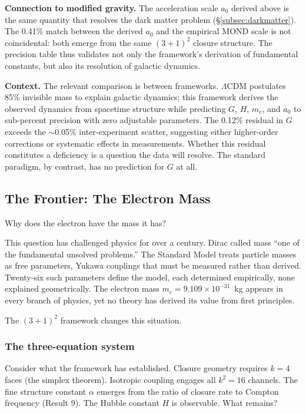 \documentclass[aps,prd,preprint,superscriptaddress,showpacs,preprintnumbers,amsmath,amssymb,nofootinbib]{revtex4-2}
\begin{document}
\textbf{Connection to modified gravity.} The acceleration scale $a_0$ derived above is the same quantity that resolves the dark matter problem (\S\ref{subsec:darkmatter}). The 0.41\% match between the derived $a_0$ and the empirical MOND scale is not coincidental: both emerge from the same $(3+1)^2$ closure structure. The precision table thus validates not only the framework's derivation of fundamental constants, but also its resolution of galactic dynamics.

\textbf{Context.} The relevant comparison is between frameworks. $\Lambda$CDM postulates 85\% invisible mass to explain galactic dynamics; this framework derives the observed dynamics from spacetime structure while predicting $G$, $H$, $m_e$, and $a_0$ to sub-percent precision with zero adjustable parameters. The 0.12\% residual in $G$ exceeds the $\sim$0.05\% inter-experiment scatter, suggesting either higher-order corrections or systematic effects in measurements. Whether this residual constitutes a deficiency is a question the data will resolve. The standard paradigm, by contrast, has no prediction for $G$ at all.

\subsection{The Frontier: The Electron Mass}
\label{subsec:frontier}

Why does the electron have the mass it has?

This question has challenged physics for over a century. Dirac called mass ``one of the fundamental unsolved problems.'' The Standard Model treats particle masses as free parameters, Yukawa couplings that must be measured rather than derived. Twenty-six such parameters define the model, each determined empirically, none explained geometrically. The electron mass $m_e = 9.109 \times 10^{-31}$~kg appears in every branch of physics, yet no theory has derived its value from first principles.

The $(3+1)^2$ framework changes this situation.

\subsubsection*{The three-equation system}

Consider what the framework has established. Closure geometry requires $k = 4$ faces (the simplex theorem). Isotropic coupling engages all $k^2 = 16$ channels. The fine structure constant $\alpha$ emerges from the ratio of closure rate to Compton frequency (Result 9). The Hubble constant $H$ is observable. What remains?
\end{document}
